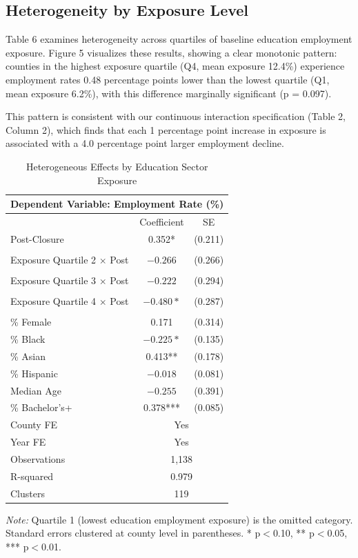 \documentclass[12pt]{article}
\begin{document}
\clearpage

\subsection{Heterogeneity by Exposure Level}

Table 6 examines heterogeneity across quartiles of baseline education employment exposure. Figure 5 visualizes these results, showing a clear monotonic pattern: counties in the highest exposure quartile (Q4, mean exposure 12.4\%) experience employment rates 0.48 percentage points lower than the lowest quartile (Q1, mean exposure 6.2\%), with this difference marginally significant (p = 0.097).

This pattern is consistent with our continuous interaction specification (Table 2, Column 2), which finds that each 1 percentage point increase in exposure is associated with a 4.0 percentage point larger employment decline.

\begin{table}[H]
\centering
\caption{Heterogeneous Effects by Education Sector Exposure}
\label{tab:hetero}
\small
\begin{tabular}{lcc}
\toprule
\multicolumn{3}{l}{Dependent Variable: Employment Rate (\%)} \\
\midrule
& Coefficient & SE \\
\midrule
Post-Closure & 0.352* & (0.211) \\
& & \\
Exposure Quartile 2 $\times$ Post & $-0.266$ & (0.266) \\
& & \\
Exposure Quartile 3 $\times$ Post & $-0.222$ & (0.294) \\
& & \\
Exposure Quartile 4 $\times$ Post & $-0.480*$ & (0.287) \\
& & \\
\% Female & 0.171 & (0.314) \\
\% Black & $-0.225*$ & (0.135) \\
\% Asian & 0.413** & (0.178) \\
\% Hispanic & $-0.018$ & (0.081) \\
Median Age & $-0.255$ & (0.391) \\
\% Bachelor's+ & 0.378*** & (0.085) \\
\midrule
County FE & \multicolumn{2}{c}{Yes} \\
Year FE & \multicolumn{2}{c}{Yes} \\
Observations & \multicolumn{2}{c}{1,138} \\
R-squared & \multicolumn{2}{c}{0.979} \\
Clusters & \multicolumn{2}{c}{119} \\
\bottomrule
\end{tabular}
\captionsetup{justification=raggedright,singlelinecheck=false}
\vspace{0.2cm}
\textit{Note:} Quartile 1 (lowest education employment exposure) is the omitted category. Standard errors clustered at county level in parentheses. * p$<$0.10, ** p$<$0.05, *** p$<$0.01.
\end{table}
\end{document}
